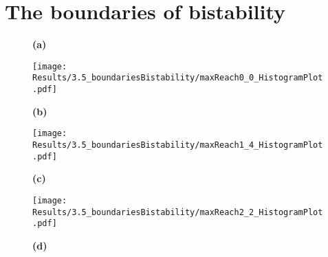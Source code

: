     \section{The boundaries of bistability}
        \label{sec:ResBoundariesBistability}
        \begin{figure}[htpb!]
            \centering
            \begin{minipage}{0.77\textwidth}
                \begin{minipage}{0.1\textwidth}
                    \caption*{\small \textbf{(a)}}
                    \label{}
                \end{minipage}
                \begin{minipage}{0.66\textwidth}
                    \texttt{[image: Results/3.5\_boundariesBistability/maxReach0\_0\_HistogramPlot.pdf]}
                    \label{}
                \end{minipage}
            \end{minipage}
            \begin{minipage}{0.77\textwidth}
                \begin{minipage}{0.1\textwidth}
                    \caption*{\small \textbf{(b)}}
                \end{minipage}
                \begin{minipage}{0.66\textwidth}
                    \texttt{[image: Results/3.5\_boundariesBistability/maxReach1\_4\_HistogramPlot.pdf]}
                \end{minipage}
            \end{minipage}
            \begin{minipage}{0.77\textwidth}
                \begin{minipage}{0.1\textwidth}
                    \caption*{\small \textbf{(c)}}
                    \label{}
                \end{minipage}
                \begin{minipage}{0.66\textwidth}
                    \texttt{[image: Results/3.5\_boundariesBistability/maxReach2\_2\_HistogramPlot.pdf]}
                    \label{}
                \end{minipage}
            \end{minipage}
            \begin{minipage}{0.77\textwidth}
                \begin{minipage}{0.1\textwidth}
                    \caption*{\small \textbf{(d)}}

\end{minipage}
\end{minipage}
\end{figure}
